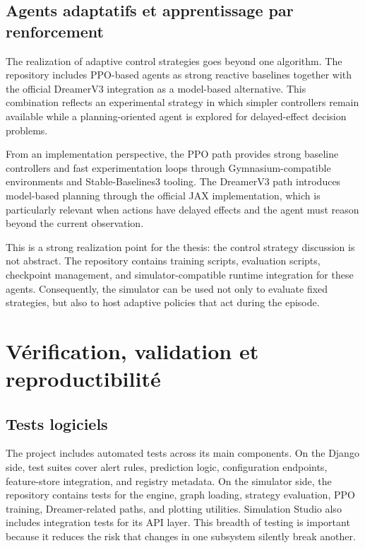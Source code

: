 \subsection{Agents adaptatifs et apprentissage par renforcement}
\label{sec:rl-realization}

The realization of adaptive control strategies goes beyond one algorithm. The repository includes PPO-based agents as strong reactive baselines together with the official DreamerV3 integration as a model-based alternative. This combination reflects an experimental strategy in which simpler controllers remain available while a planning-oriented agent is explored for delayed-effect decision problems.

From an implementation perspective, the PPO path provides strong baseline controllers and fast experimentation loops through Gymnasium-compatible environments and Stable-Baselines3 tooling. The DreamerV3 path introduces model-based planning through the official JAX implementation, which is particularly relevant when actions have delayed effects and the agent must reason beyond the current observation.

This is a strong realization point for the thesis: the control strategy discussion is not abstract. The repository contains training scripts, evaluation scripts, checkpoint management, and simulator-compatible runtime integration for these agents. Consequently, the simulator can be used not only to evaluate fixed strategies, but also to host adaptive policies that act during the episode.

\section{Vérification, validation et reproductibilité}
\label{sec:verification-realization}

\subsection{Tests logiciels}
\label{sec:software-testing-realization}

The project includes automated tests across its main components. On the Django side, test suites cover alert rules, prediction logic, configuration endpoints, feature-store integration, and registry metadata. On the simulator side, the repository contains tests for the engine, graph loading, strategy evaluation, PPO training, Dreamer-related paths, and plotting utilities. Simulation Studio also includes integration tests for its API layer. This breadth of testing is important because it reduces the risk that changes in one subsystem silently break another.

